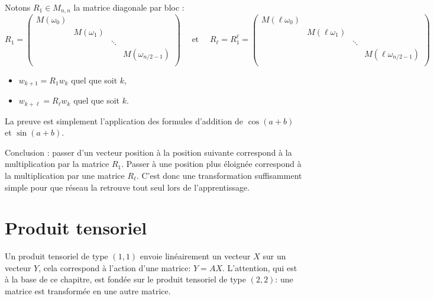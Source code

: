\documentclass[11pt,class=report,crop=false]{standalone}
\begin{document}


Notons $R_1 \in M_{n,n}$ la matrice diagonale par bloc :
{\small
\[
R_1 = 
\begin{pmatrix}
	M(\omega_0) & && \\ 
	& M(\omega_1) & &  \\
	& & \ddots &  \\
	& & & M(\omega_{n/2-1}) \\ 			
\end{pmatrix}
\quad \text{ et } \quad
R_\ell = R_1^\ell = 
\begin{pmatrix}
	M(\ell\omega_0) & && \\ 
	& M(\ell\omega_1) & &  \\
	& & \ddots &  \\
	& & & M(\ell\omega_{n/2-1}) \\ 			
\end{pmatrix}
\]
}

\begin{proposition}
\sauteligne
\begin{itemize}	
  \item $w_{k+1} = R_1 w_k$	quel que soit $k$,
  \item $w_{k+\ell} = R_\ell w_k$ quel que soit $k$.
\end{itemize}
\end{proposition}

La preuve est simplement l'application des formules d'addition de $\cos(a+b)$ et $\sin(a+b)$.

Conclusion : passer d'un vecteur position à la position suivante correspond à la multiplication par la matrice $R_1$. Passer à une position plus éloignée correspond à la multiplication par une matrice $R_\ell$. C'est donc une transformation suffisamment simple pour que réseau la retrouve tout seul lors de l'apprentissage.


\section{Produit tensoriel}


Un produit tensoriel de type $(1,1)$ envoie linéairement un vecteur $X$ sur un vecteur $Y$, cela correspond à l'action d'une matrice: $Y = AX$.
L'attention, qui est à la base de ce chapitre, est fondée sur le produit tensoriel de type $(2,2)$: une matrice est transformée en une autre matrice.
\end{document}
